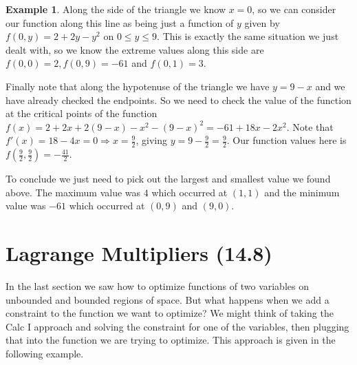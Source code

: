 \documentclass[12pt, letter]{article}
\theoremstyle{plain}
\numberwithin{theorem}{section}
\theoremstyle{definition}
\newtheorem{example}[theorem]{Example}
\begin{document}
\begin{example}
\smallskip

Along the side of the triangle we know $x=0$, so we can consider our function along this line as being just a function of $y$ given by $f(0,y) = 2+2y-y^2$ on $0\leq y\leq 9$. This is exactly the same situation we just dealt with, so we know the extreme values along this side are $f(0,0) = 2, f(0,9) = -61$ and $f(0,1)=3$. 

\smallskip

Finally note that along the hypotenuse of the triangle we have $y=9-x$ and we have already checked the endpoints. So we need to check the value of the function at the critical points of the function $f(x) = 2+2x+2(9-x)-x^2-(9-x)^2 = -61+18x-2x^2$. Note that $f'(x) = 18-4x = 0 \Rightarrow x=\frac{9}{2}$, giving $y=9-\frac{9}{2} = \frac{9}{2}$. Our function values here is $f(\frac{9}{2},\frac{9}{2}) = -\frac{41}{2}$.

\smallskip

To conclude we just need to pick out the largest and smallest value we found above. The maximum value was $4$ which occurred at $(1,1)$ and the minimum value was $-61$ which occurred at $(0,9)$ and $(9,0)$.
\end{example}

\newpage


\section{Lagrange Multipliers (14.8)}

In the last section we saw how to optimize functions of two variables on unbounded and bounded regions of space. But what happens when we add a constraint to the function we want to optimize? We might think of taking the Calc I approach and solving the constraint for one of the variables, then plugging that into the function we are trying to optimize. This approach is given in the following example.

\bigskip

\hrulefill

\bigskip
\end{document}

